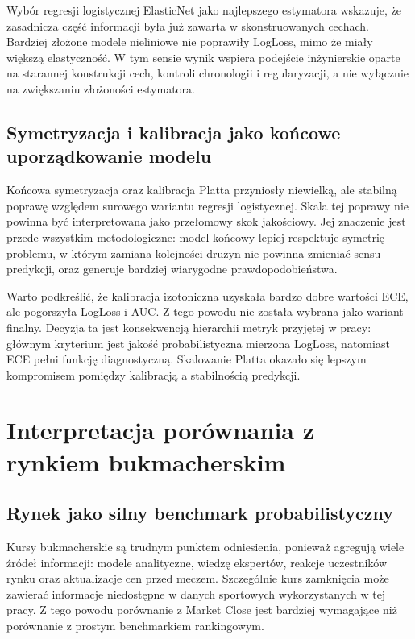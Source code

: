 Wybór regresji logistycznej ElasticNet jako najlepszego estymatora wskazuje, że zasadnicza część
informacji była już zawarta w skonstruowanych cechach. Bardziej złożone modele nieliniowe nie
poprawiły LogLoss, mimo że miały większą elastyczność. W tym sensie wynik wspiera podejście
inżynierskie oparte na starannej konstrukcji cech, kontroli chronologii i regularyzacji, a nie
wyłącznie na zwiększaniu złożoności estymatora.

\subsection{Symetryzacja i kalibracja jako końcowe uporządkowanie modelu}

Końcowa symetryzacja oraz kalibracja Platta przyniosły niewielką, ale stabilną poprawę względem
surowego wariantu regresji logistycznej. Skala tej poprawy nie powinna być interpretowana jako
przełomowy skok jakościowy. Jej znaczenie jest przede wszystkim metodologiczne: model końcowy lepiej
respektuje symetrię problemu, w którym zamiana kolejności drużyn nie powinna zmieniać sensu
predykcji, oraz generuje bardziej wiarygodne prawdopodobieństwa.

Warto podkreślić, że kalibracja izotoniczna uzyskała bardzo dobre wartości ECE, ale pogorszyła
LogLoss i AUC. Z tego powodu nie została wybrana jako wariant finalny. Decyzja ta jest konsekwencją
hierarchii metryk przyjętej w pracy: głównym kryterium jest jakość probabilistyczna mierzona
LogLoss, natomiast ECE pełni funkcję diagnostyczną. Skalowanie Platta okazało się lepszym
kompromisem pomiędzy kalibracją a stabilnością predykcji.

\section{Interpretacja porównania z rynkiem bukmacherskim}

\subsection{Rynek jako silny benchmark probabilistyczny}

Kursy bukmacherskie są trudnym punktem odniesienia, ponieważ agregują wiele źródeł informacji:
modele analityczne, wiedzę ekspertów, reakcje uczestników rynku oraz aktualizacje cen przed meczem.
Szczególnie kurs zamknięcia może zawierać informacje niedostępne w danych sportowych wykorzystanych
w tej pracy. Z tego powodu porównanie z Market Close jest bardziej wymagające niż porównanie z
prostym benchmarkiem rankingowym.

